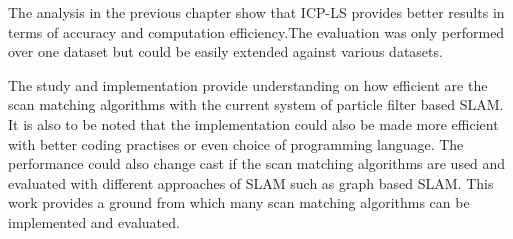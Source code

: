 The analysis in the previous chapter show that ICP-LS provides better results in terms of accuracy and computation efficiency.The evaluation was only performed over one dataset but could be easily extended  against various datasets.
\par
The study and implementation provide understanding on how efficient are the scan matching algorithms with the current system of particle filter based SLAM. It is also to be noted that the implementation could also be made more efficient with better coding practises or even choice of programming language. The performance could also change cast if the scan matching algorithms are used and evaluated with different approaches of SLAM such as graph based SLAM. This work provides a ground from which many scan matching algorithms can be implemented and evaluated.